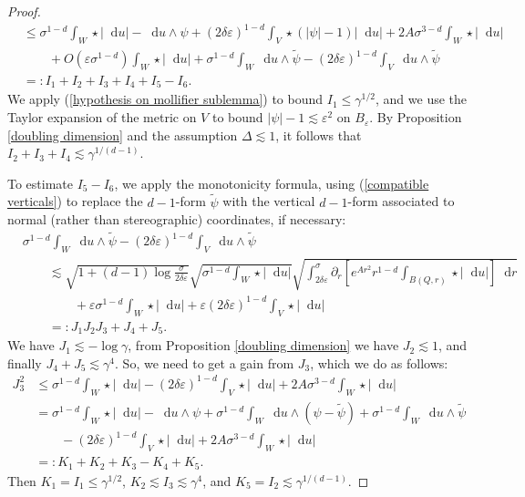 \documentclass[reqno,10pt]{amsart}
\newcommand*\dif{\mathop{}\!\mathrm{d}}
\theoremstyle{definition}
\numberwithin{equation}{section}
\begin{document}
\begin{proof}
\begin{align*}
&\leq \sigma^{1 - d}\int_W \star |\dif u| - \dif u \wedge \psi + (2\delta\varepsilon)^{1 - d} \int_V \star(|\psi| - 1)|\dif u| + 2A\sigma^{3 - d} \int_W \star |\dif u| \\
&\qquad + O(\varepsilon \sigma^{1 - d}) \int_W \star |\dif u| + \sigma^{1 - d}\int_W \dif u \wedge \tilde \psi - (2\delta\varepsilon)^{1 - d}\int_V \dif u \wedge \tilde \psi\\
&=: I_1 + I_2 + I_3 + I_4 + I_5 - I_6.
\end{align*}
We apply (\ref{hypothesis on mollifier sublemma}) to bound $I_1 \leq \gamma^{1/2}$, and we use the Taylor expansion of the metric on $V$ to bound $|\psi| - 1 \lesssim \varepsilon^2$ on $B_\varepsilon$.
By Proposition \ref{doubling dimension} and the assumption $\Delta \lesssim 1$, it follows that $I_2 + I_3 + I_4 \lesssim \gamma^{1/(d - 1)}$.

To estimate $I_5 - I_6$, we apply the monotonicity formula, using (\ref{compatible verticals}) to replace the $d-1$-form $\tilde \psi$ with the vertical $d-1$-form associated to normal (rather than stereographic) coordinates, if necessary:
\begin{align*}
&\sigma^{1 - d} \int_W \dif u \wedge \tilde \psi - (2\delta\varepsilon)^{1 - d} \int_V \dif u \wedge \tilde \psi \\
&\qquad \lesssim \sqrt{1 + (d - 1) \log \frac{\sigma}{2\delta\varepsilon}} \sqrt{\sigma^{1 - d} \int_W \star |\dif u|} \sqrt{\int_{2\delta\varepsilon}^\sigma \partial_r \left[e^{Ar^2} r^{1 - d} \int_{B(Q, r)} \star |\dif u|\right] \dif r}\\
&\qquad \qquad + \varepsilon \sigma^{1 - d} \int_W \star |\dif u| + \varepsilon (2\delta\varepsilon)^{1 - d} \int_V \star |\dif u| \\
&\qquad =: J_1 J_2 J_3 + J_4 + J_5.
\end{align*}
We have $J_1 \lesssim -\log \gamma$, from Proposition \ref{doubling dimension} we have $J_2 \lesssim 1$, and finally $J_4 + J_5 \lesssim \gamma^4$.
So, we need to get a gain from $J_3$, which we do as follows:
\begin{align*}
J_3^2 &\leq \sigma^{1 - d} \int_W \star |\dif u| - (2 \delta \varepsilon)^{1 - d} \int_V \star |\dif u| + 2A\sigma^{3 - d} \int_W \star |\dif u| \\
&= \sigma^{1 - d} \int_W \star |\dif u| - \dif u \wedge \psi + \sigma^{1 - d} \int_W \dif u \wedge (\psi - \tilde \psi) + \sigma^{1 - d} \int_W \dif u \wedge \tilde \psi \\
&\qquad - (2 \delta\varepsilon)^{1 - d} \int_V \star |\dif u| + 2A \sigma^{3 - d} \int_W \star |\dif u| \\
&=: K_1 + K_2 + K_3 - K_4 + K_5.
\end{align*}
Then $K_1 = I_1 \leq \gamma^{1/2}$, $K_2 \lesssim I_3 \lesssim \gamma^4$, and $K_5 = I_2 \lesssim \gamma^{1/(d - 1)}$.


\end{proof}
\end{document}
